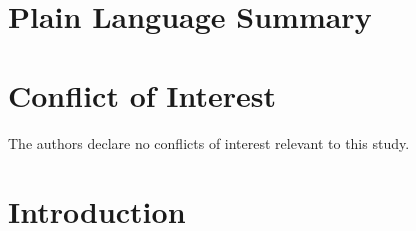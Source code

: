 \documentclass[draft]{agujournal2019}
\begin{document}
\begin{abstract}
	\begin{enumerate}
		\item Bibliography
		      \begin{itemize}
			      \item Review of spatio-temporal seismicity migration data and the associated migration models
			      \item Review of models of fluid injection and the proposed physical mechanisms of induced seismicity
		      \end{itemize}
	\end{enumerate}
\end{abstract}

\section*{Plain Language Summary}

\section*{Conflict of Interest}
The authors declare no conflicts of interest relevant to this study.

%
%

\section{Introduction}

\end{document}
